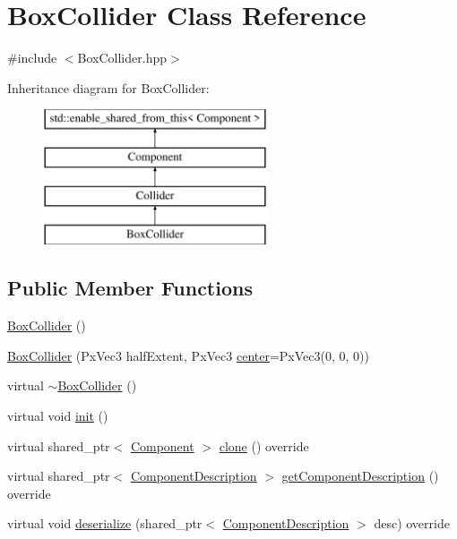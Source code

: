 \hypertarget{class_box_collider}{}\section{Box\+Collider Class Reference}
\label{class_box_collider}


{\ttfamily \#include $<$Box\+Collider.\+hpp$>$}

Inheritance diagram for Box\+Collider\+:\begin{figure}[H]
\begin{center}
\leavevmode
\includegraphics[height=4.000000cm]{class_box_collider}
\end{center}
\end{figure}
\subsection*{Public Member Functions}
\begin{DoxyCompactItemize}
\item 
\hyperlink{class_box_collider_aa8358aaf4f5fae5446ebdf0b303ccce3}{Box\+Collider} ()
\item 
\hyperlink{class_box_collider_a13f840ee628a62add163a77aea76224b}{Box\+Collider} (Px\+Vec3 half\+Extent, Px\+Vec3 \hyperlink{class_collider_a42b57aa35ab665daf89ae844e479c560}{center}=Px\+Vec3(0, 0, 0))
\item 
virtual \hyperlink{class_box_collider_a8c33dbb4325d76d441de38b7c4ae43af}{$\sim$\+Box\+Collider} ()
\item 
virtual void \hyperlink{class_box_collider_ad98ff62ff6b5c48dc8f18b1a2d2429e4}{init} ()
\item 
virtual shared\+\_\+ptr$<$ \hyperlink{class_component}{Component} $>$ \hyperlink{class_box_collider_ab9154438078b0fb9d33f2f8958e3a71e}{clone} () override
\item 
virtual shared\+\_\+ptr$<$ \hyperlink{class_component_description}{Component\+Description} $>$ \hyperlink{group__serialization__functions_gad0cea24e9390a50ce68178944128cfab}{get\+Component\+Description} () override
\item 
virtual void \hyperlink{group__serialization__functions_ga495b07647b7b0c2a843be54180dab9e4}{deserialize} (shared\+\_\+ptr$<$ \hyperlink{class_component_description}{Component\+Description} $>$ desc) override
\end{DoxyCompactItemize}
